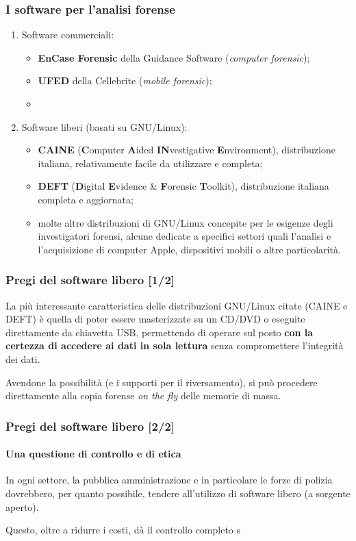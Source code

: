 \documentclass[11pt]{beamer}
\begin{document}
	\begin{frame}
		\frametitle{I software per l'analisi forense}
		\begin{enumerate}
			\item Software commerciali:
			\begin{itemize}
				\item \textbf{EnCase Forensic} della Guidance Software (\textit{computer forensic});
				\item \textbf{UFED} della Cellebrite (\textit{mobile forensic});
				\item \textellipsis
			\end{itemize}
			\item Software liberi (basati su GNU/Linux):
			\begin{itemize}
				\item \textbf{CAINE} (\textbf{C}omputer \textbf{A}ided \textbf{IN}vestigative \textbf{E}nvironment), distribuzione italiana, relativamente facile da utilizzare e completa;
				\item \textbf{DEFT} (\textbf{D}igital \textbf{E}vidence \& \textbf{F}orensic \textbf{T}oolkit), distribuzione italiana completa e aggiornata;
				\item molte altre distribuzioni di GNU/Linux concepite per le esigenze degli investigatori forensi, alcune dedicate a specifici settori quali l'analisi e l'acquisizione di computer Apple, dispositivi mobili o altre particolarità.
			\end{itemize}
		\end{enumerate}
	\end{frame}
	
	
	\begin{frame}
		\frametitle{Pregi del software libero [1/2]}
		La più interessante caratteristica delle distribuzioni GNU/Linux citate (CAINE e DEFT) è quella di poter essere masterizzate su un CD/DVD o eseguite direttamente da chiavetta USB, permettendo di operare sul posto \textbf{con la certezza di accedere ai dati in sola lettura} senza compromettere l'integrità dei dati. 
		
		Avendone la possibilità (e i supporti per il riversamento), si può procedere direttamente alla copia forense \textit{on the fly} delle memorie di massa.
		
	\end{frame}
	
	\begin{frame}
		\frametitle{Pregi del software libero [2/2]}
		\framesubtitle{Una questione di controllo e di etica}
		
		In ogni settore, la pubblica amministrazione e in particolare le forze di polizia dovrebbero, per quanto possibile, tendere all'utilizzo di software libero (a sorgente aperto).
		
		Questo, oltre a ridurre i costi, dà il controllo completo s
		
	\end{frame}
	
\end{document}

